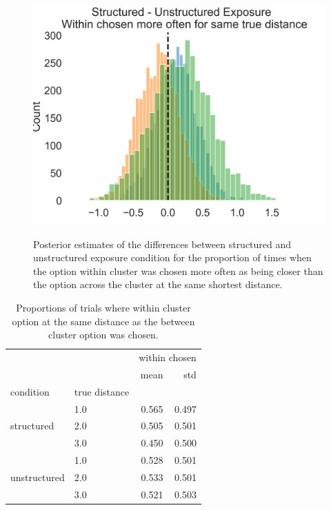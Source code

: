 \begin{figure}
    \centering
    \caption{Posterior estimates of the differences between structured and unstructured exposure condition for the proportion of times when the option within cluster was chosen more often as being closer than the option across the cluster at the same shortest distance.}
    \includegraphics[width = \textwidth]{chapter_notebooks/chapter_3/figures/exp3_bayesmodel_results.png}
    \label{fig:exp3-bayesmodel_results}
\end{figure}

\begin{table}
    \centering
    \begin{tabular}{llrr}
        \toprule
         &  & \multicolumn{2}{r}{within chosen} \\
         &  & mean & std \\
        condition & true distance &  &  \\
        \midrule
        \multirow[t]{3}{*}{structured} & 1.0 & 0.565 & 0.497 \\
         & 2.0 & 0.505 & 0.501 \\
         & 3.0 & 0.450 & 0.500 \\
        \cline{1-4}
        \multirow[t]{3}{*}{unstructured} & 1.0 & 0.528 & 0.501 \\
         & 2.0 & 0.533 & 0.501 \\
         & 3.0 & 0.521 & 0.503 \\
        \cline{1-4}
        \bottomrule
    \end{tabular}
     \caption{Proportions of trials where within cluster option at the same distance as the between cluster option was chosen.}   
     \label{tab:exp3-choice-stats}
\end{table}


